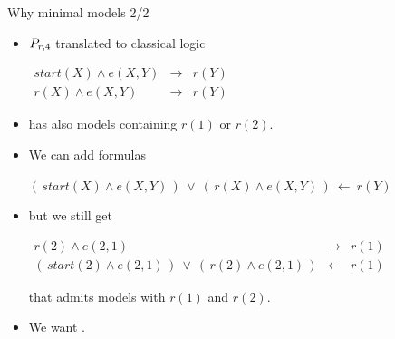 \documentclass[trans,draft]{beamer} %
\begin{document}
\begin{frame}{Why minimal models 2/2}
	\onslide<+->
	
	\begin{itemize}
		\item $P_{r,4}$ translated to classical logic
			\begin{center}
				$\begin{array}{rcl}
				start(X) \wedge e(X,Y) & \rightarrow & r(Y) \\
				r(X) \wedge e(X,Y) & \rightarrow & r(Y)
				\end{array}$
			\end{center}
		
		\item has also models containing $r(1)$ or $r(2)$.
		
		\onslide<+->
		
		\item We can add formulas
			\begin{center}
				$(\,start(X) \wedge e(X,Y)\,)\ \vee\ (\,r(X) \wedge e(X,Y)\,) \ \leftarrow \ r(Y)$
			\end{center}
		
		\onslide<+->
		
		\item but we still get
			\begin{center}
				$\begin{array}{rcl}
				r(2) \wedge e(2,1) & \rightarrow & r(1) \\
				(\,start(2) \wedge e(2,1)\,)\ \vee\ (\,r(2) \wedge e(2,1)\,) & \leftarrow & r(1)
				\end{array}$
			\end{center}
			that admits models with $r(1)$ and $r(2)$.
		
		\onslide<+->
		
		\item We want .
		
	\end{itemize}
	
\end{frame}
\end{document}
